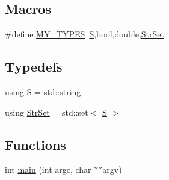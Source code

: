 \subsection*{Macros}
\begin{DoxyCompactItemize}
\item 
\#define \hyperlink{_models_2_formal_language_theory-_complex_2main_8cpp_a9982c6df11148a7d221b1839f38633a5}{M\+Y\+\_\+\+T\+Y\+P\+ES}~\hyperlink{_models_2_formal_language_theory-_complex_2main_8cpp_a51c40915539205f0b5add30b0d68a4cb}{S},bool,double,\hyperlink{_models_2_formal_language_theory-_complex_2main_8cpp_a809d982ed20fa378f251596c3b5ad6b7}{Str\+Set}
\end{DoxyCompactItemize}
\subsection*{Typedefs}
\begin{DoxyCompactItemize}
\item 
using \hyperlink{_models_2_formal_language_theory-_complex_2main_8cpp_a51c40915539205f0b5add30b0d68a4cb}{S} = std\+::string
\item 
using \hyperlink{_models_2_formal_language_theory-_complex_2main_8cpp_a809d982ed20fa378f251596c3b5ad6b7}{Str\+Set} = std\+::set$<$ \hyperlink{_models_2_formal_language_theory-_complex_2main_8cpp_a51c40915539205f0b5add30b0d68a4cb}{S} $>$
\end{DoxyCompactItemize}
\subsection*{Functions}
\begin{DoxyCompactItemize}
\item 
int \hyperlink{_models_2_formal_language_theory-_complex_2main_8cpp_a3c04138a5bfe5d72780bb7e82a18e627}{main} (int argc, char $\ast$$\ast$argv)
\end{DoxyCompactItemize}
